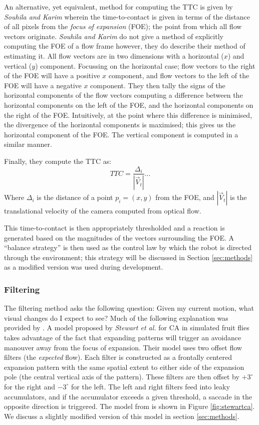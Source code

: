 \documentclass[a4paper,12pt]{article}
\begin{document}
An alternative, yet equivalent, method for computing the TTC is given by \textit{Souhila and Karim}
wherein the time-to-contact is given in terms of the distance of all pixels from the \textit{focus of expansion}
(FOE); the point from which all flow vectors originate. \textit{Souhila and Karim} do
not give a method of explicitly computing the FOE of a flow frame
however, they do describe their method of estimating it. All flow vectors are in two dimensions with a
horizontal ($x$) and vertical ($y$) component. Focussing on the horizontal case; flow vectors to the
right of the FOE will have a positive $x$ component, and flow vectors to the left of the FOE will have a negative
$x$ component. They then tally the signs of the horizontal components of the flow vectors computing a
difference between the horizontal components on the left of the FOE, and the horizontal components on the
right of the FOE. Intuitively, at the point where this difference is minimised, the divergence of the
horizontal components is maximised; this gives us the horizontal component of the FOE. The vertical
component is computed in a similar manner.
\newline

Finally, they compute the TTC as:
\begin{equation}
TTC = \frac{\Delta_i}{|\vec{V}_t|} \dots
\end{equation}
Where $\Delta_i$ is the distance of a point $p_i = (x,y)$ from the FOE, and $|\vec{V}_t|$ is the
translational velocity of the camera computed from optical flow\cite{Souhila2007}.
\newline

This time-to-contact is then appropriately thresholded and a reaction is generated based on the
magnitudes of the vectors surrounding the FOE. A ``balance strategy'' is then used as the control law by which
the robot is directed through the environment; this strategy will be discussed in Section \ref{sec:methods}
as a modified version was used during development.


\subsubsection{ Filtering }
The filtering method asks the following question: Given my current motion, what visual changes do
I expect to see? Much of the following explanation was provided by \cite{Stewart2010}.
A model proposed by \textit{Stewart et al.} for CA in simulated fruit flies takes
advantage of the fact that expanding patterns will trigger an avoidance manouver away from the focus
of expansion\cite{Stewart2010}. Their model uses two offset flow filters (the \textit{expected}
flow). Each filter is constructed as a frontally centered expansion pattern with the same spatial
extent to either side of the expansion pole (the central vertical axis of the pattern). These filters
are then offset by $+3^{\circ}$ for the right and $-3^{\circ}$ for the left. The left and right
filters feed into leaky accumulators, and if the accumulator exceeds a given threshold, a saccade
in the opposite direction is triggered. The model from \cite{Stewart2010} is shown in Figure
\ref{fig:stewartca}. We discuss a slightly modified version of this model in section
\ref{sec:methods}.
\end{document}
